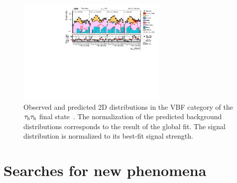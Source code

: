 \documentclass[10pt]{article}
\begin{document}
\begin{figure}[htb]
\centering
\includegraphics[height=2in]{figures/CMS-HIG-16-043__Figure_013__tauhtauh-VBF.pdf}
\caption{
  Observed and predicted 2D distributions in the VBF category of the
  $\tau_{\rm h}\tau_{\rm h}$ final state~\cite{CMS:2017wyg}. The normalization
  of the predicted background distributions corresponds to the result of the
  global fit. The signal distribution is normalized to its best-fit signal
  strength.
}
\label{fig:tauhtauh_VBF}
\end{figure}


\section{Searches for new phenomena}
\end{document}

